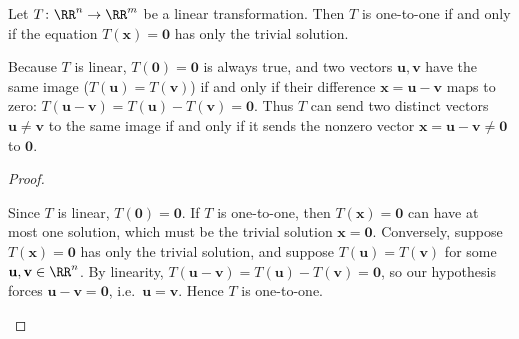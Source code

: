 \documentclass[10pt]{scrartcl}
\newcommand{\vv}[1]{\mathbf{#1}}
\begin{document}
\begin{theorem*}
  Let $T\colon\RR^n\to\RR^m$ be a linear transformation. Then $T$ is one-to-one if and only if the equation $T(\vv x)=\vv 0$ has only the trivial solution.
\end{theorem*}
\begin{ideabox}
  Because $T$ is linear, $T(\vv 0)=\vv 0$ is always true, and two vectors $\vv u,\vv v$ have the same image ($T(\vv u)=T(\vv v)$) if and only if their difference $\vv x=\vv u-\vv v$ maps to zero: $T(\vv u-\vv v)=T(\vv u)-T(\vv v)=\vv 0$. Thus $T$ can send two distinct vectors $\vv u\ne\vv v$ to the same image if and only if it sends the nonzero vector $\vv x=\vv u-\vv v\ne\vv 0$ to $\vv 0$.
\end{ideabox}
\begin{proof}
  \begin{steps}
    \ii Since $T$ is linear, $T(\vv 0)=\vv 0$. If $T$ is one-to-one, then $T(\vv x)=\vv 0$ can have at most one solution, which must be the trivial solution $\vv x=\vv 0$.
    \ii Conversely, suppose $T(\vv x)=\vv 0$ has only the trivial solution, and suppose $T(\vv u)=T(\vv v)$ for some $\vv u,\vv v\in\RR^n$. By linearity, $T(\vv u-\vv v)=T(\vv u)-T(\vv v)=\vv 0$, so our hypothesis forces $\vv u-\vv v=\vv 0$, i.e.\ $\vv u=\vv v$. Hence $T$ is one-to-one.
  \end{steps}
\end{proof}
\end{document}
